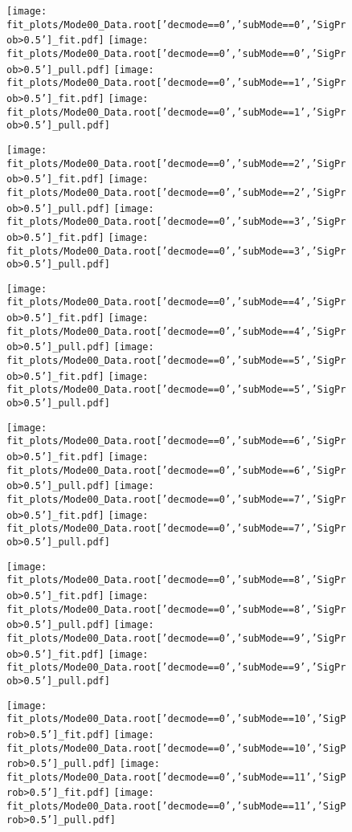 \begin{figure}[p!]
\begin{center}
\texttt{[image: fit\_plots/Mode00\_Data.root['decmode==0','subMode==0','SigProb>0.5']\_fit.pdf]}
\texttt{[image: fit\_plots/Mode00\_Data.root['decmode==0','subMode==0','SigProb>0.5']\_pull.pdf]}
\texttt{[image: fit\_plots/Mode00\_Data.root['decmode==0','subMode==1','SigProb>0.5']\_fit.pdf]}
\texttt{[image: fit\_plots/Mode00\_Data.root['decmode==0','subMode==1','SigProb>0.5']\_pull.pdf]}

\texttt{[image: fit\_plots/Mode00\_Data.root['decmode==0','subMode==2','SigProb>0.5']\_fit.pdf]}
\texttt{[image: fit\_plots/Mode00\_Data.root['decmode==0','subMode==2','SigProb>0.5']\_pull.pdf]}
\texttt{[image: fit\_plots/Mode00\_Data.root['decmode==0','subMode==3','SigProb>0.5']\_fit.pdf]}
\texttt{[image: fit\_plots/Mode00\_Data.root['decmode==0','subMode==3','SigProb>0.5']\_pull.pdf]}

\texttt{[image: fit\_plots/Mode00\_Data.root['decmode==0','subMode==4','SigProb>0.5']\_fit.pdf]}
\texttt{[image: fit\_plots/Mode00\_Data.root['decmode==0','subMode==4','SigProb>0.5']\_pull.pdf]}
\texttt{[image: fit\_plots/Mode00\_Data.root['decmode==0','subMode==5','SigProb>0.5']\_fit.pdf]}
\texttt{[image: fit\_plots/Mode00\_Data.root['decmode==0','subMode==5','SigProb>0.5']\_pull.pdf]}

\texttt{[image: fit\_plots/Mode00\_Data.root['decmode==0','subMode==6','SigProb>0.5']\_fit.pdf]}
\texttt{[image: fit\_plots/Mode00\_Data.root['decmode==0','subMode==6','SigProb>0.5']\_pull.pdf]}
\texttt{[image: fit\_plots/Mode00\_Data.root['decmode==0','subMode==7','SigProb>0.5']\_fit.pdf]}
\texttt{[image: fit\_plots/Mode00\_Data.root['decmode==0','subMode==7','SigProb>0.5']\_pull.pdf]}

\texttt{[image: fit\_plots/Mode00\_Data.root['decmode==0','subMode==8','SigProb>0.5']\_fit.pdf]}
\texttt{[image: fit\_plots/Mode00\_Data.root['decmode==0','subMode==8','SigProb>0.5']\_pull.pdf]}
\texttt{[image: fit\_plots/Mode00\_Data.root['decmode==0','subMode==9','SigProb>0.5']\_fit.pdf]}
\texttt{[image: fit\_plots/Mode00\_Data.root['decmode==0','subMode==9','SigProb>0.5']\_pull.pdf]}

\texttt{[image: fit\_plots/Mode00\_Data.root['decmode==0','subMode==10','SigProb>0.5']\_fit.pdf]}
\texttt{[image: fit\_plots/Mode00\_Data.root['decmode==0','subMode==10','SigProb>0.5']\_pull.pdf]}
\texttt{[image: fit\_plots/Mode00\_Data.root['decmode==0','subMode==11','SigProb>0.5']\_fit.pdf]}
\texttt{[image: fit\_plots/Mode00\_Data.root['decmode==0','subMode==11','SigProb>0.5']\_pull.pdf]}


\end{center}
\end{figure}
